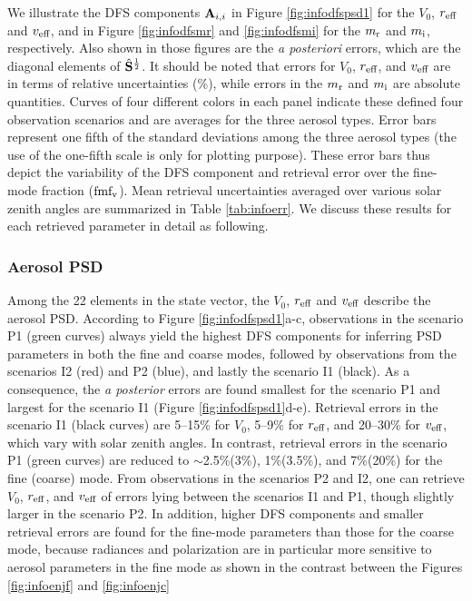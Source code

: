 We illustrate the DFS components $\mathbf{A}_{i,i}$ in Figure \ref{fig:infodfspsd1} 
for the $V_0$, $r_\text{eff}$ and $v_\text{eff}$, and in Figure \ref{fig:infodfsmr} and
\ref{fig:infodfsmi} for the $m_\text{r}$ and $m_\text{i}$, respectively. Also shown
in those figures are the \textit{a posteriori} errors, which are the diagonal 
elements of $\hat{\mathbf{S}}^{\frac{1}{2}}$. It should be noted that errors for $V_0$,
$r_\text{eff}$, and $v_\text{eff}$ are in terms of relative uncertainties (\%), while errors
in the $m_\text{r}$ and $m_\text{i}$ are absolute quantities. Curves of four different
colors in each panel indicate these defined four observation scenarios and
are averages for the three aerosol types. Error bars represent one fifth of 
the standard deviations among the three aerosol types (the use of the 
one-fifth scale is only for plotting purpose). These error bars thus depict
the variability of the DFS component and retrieval error over the fine-mode 
fraction ($\text{fmf}_\text{v}$). Mean retrieval uncertainties averaged over various solar 
zenith angles are summarized in Table \ref{tab:infoerr}. We discuss these results 
for each retrieved parameter in detail as following. 

\subsubsection{Aerosol PSD}

Among the 22 elements in the state vector, the $V_0$, $r_\text{eff}$ and $v_\text{eff}$ 
describe the aerosol PSD. According to Figure \ref{fig:infodfspsd1}a-c, 
observations in the scenario P1 (green curves) always yield the highest 
DFS components for inferring PSD parameters in both the fine and coarse modes,
followed by observations from the scenarios I2 (red) and P2 (blue), and lastly
the scenario I1 (black). As a consequence, the \textit{a posterior} errors are
found smallest for the scenario P1 and largest for the scenario I1 (Figure 
\ref{fig:infodfspsd1}d-e). Retrieval errors in the scenario I1 (black curves)
are 5--15\% for $V_0$, 5--9\% for $r_\text{eff}$, and 20--30\% for $v_\text{eff}$,
which vary with solar zenith angles. In contrast, retrieval errors in the
scenario P1 (green curves) are reduced to $\sim$2.5\%(3\%), 1\%(3.5\%), and 
7\%(20\%) for the fine (coarse) mode. From observations in the scenarios P2
and I2, one can retrieve $V_0$, $r_\text{eff}$, and $v_\text{eff}$ of errors lying between
the scenarios I1 and P1, though slightly larger in the scenario P2. 
In addition, higher DFS components and smaller retrieval errors are found for
the fine-mode parameters than those for the coarse mode, because radiances
and polarization are in particular more sensitive to aerosol parameters in the
fine mode as shown in the contrast between the Figures \ref{fig:infoenjf} and 
\ref{fig:infoenjc}

